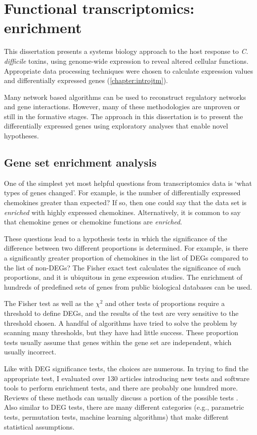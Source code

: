 \section{Functional transcriptomics: enrichment}
This dissertation presents a systems biology approach
to the host response to \textit{C. difficile} toxins,
using genome-wide expression to reveal altered cellular functions.
Appropriate data processing techniques were chosen to calculate
expression values and differentially expressed genes (\autoref{chapter:introjtm}).

Many network based algorithms can be used to reconstruct regulatory networks
and gene interactions. However, many of these methodologies are unproven
or still in the formative stages. The approach in this dissertation
is to present the differentially expressed genes using exploratory analyses
that enable novel hypotheses.

\subsection{Gene set enrichment analysis}
One of the simplest yet most helpful questions from transcriptomics data is `what
types of genes changed'. For example, is the number of differentially expressed chemokines 
greater than expected? If so, then one could say that the data
set is \textit{enriched} with highly expressed chemokines. Alternatively,
it is common to say that chemokine genes or chemokine functions
are \textit{enriched}.

These questions lead to a hypothesis tests in which the significance
of the difference between two different proportions is determined. For example,
is there a significantly greater proportion of chemokines in the list
of DEGs compared to the list of non-DEGs?
The Fisher exact test calculates the significance of such proportions, and it
is ubiquitous in gene expression studies. The enrichment of hundreds
of predefined sets of genes from public biological databases can be used.

The Fisher test as well as the $\chi^2$ and other tests of proportions
require a threshold to define DEGs, and the results of the test are
very sensitive to the threshold chosen. A handful of algorithms have
tried to solve the problem by scanning many thresholds, but they
have had little success. These proportion tests usually assume that genes within the
gene set are independent, which usually incorrect.

Like with DEG significance tests, the choices are numerous.
In trying to find the appropriate test, I evaluated over 130 articles
introducing new tests and software tools to perform enrichment tests, and there
are probably one hundred more.
Reviews of these methods can usually discuss a portion of 
the possible tests \cite{Ackermann:2009bw,Huang:2009bea,Abatangelo:2009cc,
Berg:2009tu,Dinu:2008tv}.
Also similar to DEG tests, there are many different categories (e.g., 
parametric tests, permutation tests, machine learning algorithms)
that make different statistical assumptions.

